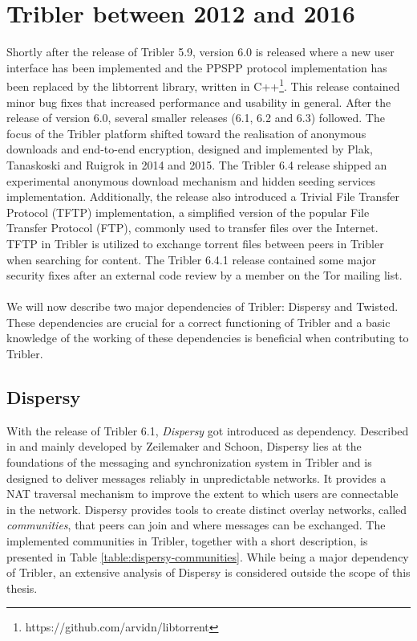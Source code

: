 \section{Tribler between 2012 and 2016}
Shortly after the release of Tribler 5.9, version 6.0 is released where a new user interface has been implemented and the PPSPP protocol implementation has been replaced by the libtorrent library, written in C++\footnote{https://github.com/arvidn/libtorrent}. This release contained minor bug fixes that increased performance and usability in general. After the release of version 6.0, several smaller releases (6.1, 6.2 and 6.3) followed. The focus of the Tribler platform shifted toward the realisation of anonymous downloads and end-to-end encryption, designed and implemented by Plak, Tanaskoski and Ruigrok in 2014 and 2015\cite{plak2014anonymous}\cite{tanaskoski2014anonymous}\cite{ruigrok2015bittorrent}. The Tribler 6.4 release shipped an experimental anonymous download mechanism and hidden seeding services implementation. Additionally, the release also introduced a Trivial File Transfer Protocol (TFTP)\cite{sollins1992tftp} implementation, a simplified version of the popular File Transfer Protocol (FTP)\cite{postel1985rfc}, commonly used to transfer files over the Internet. TFTP in Tribler is utilized to exchange torrent files between peers in Tribler when searching for content. The Tribler 6.4.1 release contained some major security fixes after an external code review by a member on the Tor mailing list\cite{githubissue1066}.\\\\
We will now describe two major dependencies of Tribler: Dispersy and Twisted. These dependencies are crucial for a correct functioning of Tribler and a basic knowledge of the working of these dependencies is beneficial when contributing to Tribler.

\subsection{Dispersy}
With the release of Tribler 6.1, \emph{Dispersy} got introduced as dependency. Described in \cite{zeilemaker2013dispersy} and mainly developed by Zeilemaker and Schoon, Dispersy lies at the foundations of the messaging and synchronization system in Tribler and is designed to deliver messages reliably in unpredictable networks. It provides a NAT traversal mechanism to improve the extent to which users are connectable in the network. Dispersy provides tools to create distinct overlay networks, called \emph{communities}, that peers can join and where messages can be exchanged. The implemented communities in Tribler, together with a short description, is presented in Table \ref{table:dispersy-communities}. While being a major dependency of Tribler, an extensive analysis of Dispersy is considered outside the scope of this thesis.

